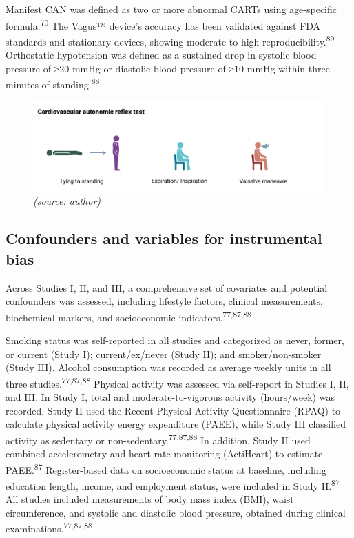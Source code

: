 \documentclass[
  letterpaper,
  headsepline=true,
  open=any]{scrbook}
\begin{document}
Manifest CAN was defined as two or more abnormal CARTs using
age-specific formula.\textsuperscript{70} The Vagus™ device's accuracy
has been validated against FDA standards and stationary devices, showing
moderate to high reproducibility.\textsuperscript{89} Orthostatic
hypotension was defined as a sustained drop in systolic blood pressure
of ≥20 mmHg or diastolic blood pressure of ≥10 mmHg within three minutes
of standing.\textsuperscript{88}

\begin{figure}

\begin{minipage}[t]{\linewidth}

{\centering 

\includegraphics{images/cart.png} \emph{(source: author)}

}

\end{minipage}%

\end{figure}

\hypertarget{confounders-and-variables-for-instrumental-bias}{%
\subsection{Confounders and variables for instrumental
bias}\label{confounders-and-variables-for-instrumental-bias}}

Across Studies I, II, and III, a comprehensive set of covariates and
potential confounders was assessed, including lifestyle factors,
clinical measurements, biochemical markers, and socioeconomic
indicators.\textsuperscript{77,87,88}

Smoking status was self-reported in all studies and categorized as
never, former, or current (Study I); current/ex/never (Study II); and
smoker/non-smoker (Study III). Alcohol consumption was recorded as
average weekly units in all three studies.\textsuperscript{77,87,88}
Physical activity was assessed via self-report in Studies I, II, and
III. In Study I, total and moderate-to-vigorous activity (hours/week)
was recorded. Study II used the Recent Physical Activity Questionnaire
(RPAQ) to calculate physical activity energy expenditure (PAEE), while
Study III classified activity as sedentary or
non-sedentary.\textsuperscript{77,87,88} In addition, Study II used
combined accelerometry and heart rate monitoring (ActiHeart) to estimate
PAEE.\textsuperscript{87} Register-based data on socioeconomic status at
baseline, including education length, income, and employment status,
were included in Study II.\textsuperscript{87} All studies included
measurements of body mass index (BMI), waist circumference, and systolic
and diastolic blood pressure, obtained during clinical
examinations.\textsuperscript{77,87,88}
\end{document}
